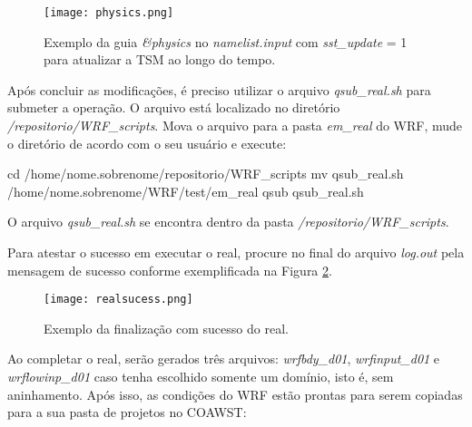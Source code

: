 \begin{figure}[H]
    \centering
    \texttt{[image: physics.png]}
    \caption{Exemplo da guia \textit{\&physics} no \textit{namelist.input} com \textit{sst\_update} = 1 para atualizar a TSM ao longo do tempo.}
    \label{physicsnamelist}
\end{figure}
\bigskip

\noindent Após concluir as modificações, é preciso utilizar o arquivo \textit{qsub\_real.sh} para submeter a operação. O arquivo está localizado no diretório \textit{/repositorio/WRF\_scripts}. Mova o arquivo para a pasta \textit{em\_real} do WRF, mude o diretório de acordo com o seu usuário e execute:
\bigskip

\begin{bashcode}
cd /home/nome.sobrenome/repositorio/WRF_scripts
mv qsub_real.sh /home/nome.sobrenome/WRF/test/em_real
qsub qsub_real.sh
\end{bashcode}
\bigskip

\begin{tcolorbox}[enhanced,
  grow to left by=0cm,%
  grow to right by=0cm,%
  enlarge top by=0cm,%
  enlarge bottom by=0cm,%
  tcbox raise base,
  boxrule=1.0pt,
  left=18mm,
  colframe=red!50!black,coltext=red!25!black,colback=red!10!white,
  overlay={\begin{tcbclipinterior}\fill[red!75!blue!50!white] (frame.south west)
    rectangle node[text=white,font=\sffamily\bfseries\footnotesize,rotate=0] {ATENÇÃO} ([xshift=18mm]frame.north west);\end{tcbclipinterior}}]
O arquivo \textit{qsub\_real.sh} se encontra dentro da pasta \textit{/repositorio/WRF\_scripts}.
\end{tcolorbox}
\bigskip

\noindent Para atestar o sucesso em executar o real, procure no final do arquivo \textit{log.out} pela mensagem de sucesso conforme exemplificada na Figura \textcolor{bleu_cite}{\ref{realfinish}}.
\bigskip

\begin{figure}[H]
    \centering
    \texttt{[image: realsucess.png]}
    \caption{Exemplo da finalização com sucesso do real.}
    \label{realfinish}
\end{figure}
\bigskip


\noindent Ao completar o real, serão gerados três arquivos: \textit{wrfbdy\_d01}, \textit{wrfinput\_d01} e \textit{wrflowinp\_d01} caso tenha escolhido somente um domínio, isto é, sem aninhamento. Após isso, as condições do WRF estão prontas para serem copiadas para a sua pasta de projetos no COAWST:
\bigskip

